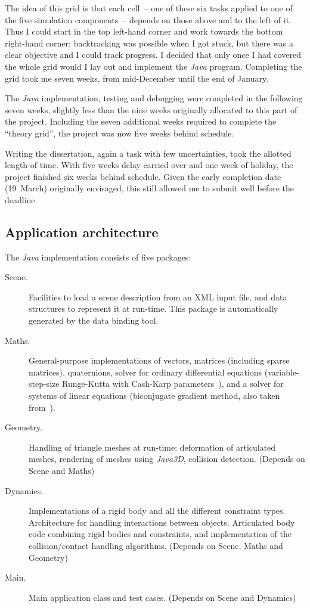 The idea of this grid is that each cell~-- one of these six tasks applied to one of the five
simulation components~-- depends on those above and to the left of it. Thus I could start in the
top left-hand corner and work towards the bottom right-hand corner; backtracking was possible when
I got stuck, but there was a clear objective and I could track progress. I decided that only
once I had covered the whole grid would I lay out and implement the \textsl{Java} program.
Completing the grid took me seven weeks, from mid-December until the end of January.

The \textsl{Java} implementation, testing and debugging were completed in the following seven
weeks, slightly less than the nine weeks originally allocated to this part of the project.
Including the seven additional weeks required to complete the ``theory grid'', the project was
now five weeks behind schedule.

Writing the dissertation, again a task with few uncertainties, took the allotted length of time.
With five weeks delay carried over and one week of holiday, the project finished six weeks behind
schedule. Given the early completion date (19~March) originally envisaged, this still
allowed me to submit well before the deadline.


\subsection{Application architecture\label{architecture}}

The \textsl{Java} implementation consists of five packages:

\begin{description}
\item[Scene.] Facilities to load a scene description from an XML input file, and data structures
    to represent it at run-time. This package is automatically generated by the data binding tool.
\item[Maths.] \sloppypar General-purpose implementations of vectors, matrices (including spar\-se
    matrices), quaternions, solver for ordinary differential equations (va\-ri\-able-step-size
    Runge-Kutta with Cash-Karp parameters~\cite{NRinC}), and a solver for systems of linear
    equations (biconjugate gradient method, also taken from~\cite{NRinC}).
\item[Geometry.] Handling of triangle meshes at run-time: deformation of articulated meshes,
    rendering of meshes using \textsl{Java3D}, collision detection. (Depends on Scene and Maths)
\item[Dynamics.] Implementations of a rigid body and all the different constraint types.
    Architecture for handling interactions between objects. Articulated body code combining
    rigid bodies and constraints, and implementation of the collision/contact handling algorithms.
    (Depends on Scene, Maths and Geometry)
\item[Main.] Main application class and test cases. (Depends on Scene and Dynamics)
\end{description}


